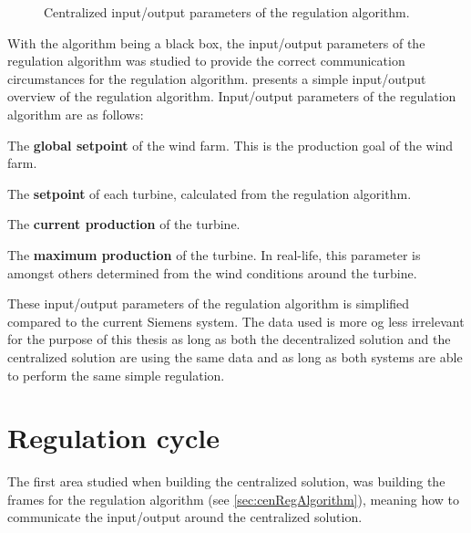 \begin{figure}
	\centering
	

	\caption[Centralized input/output parameters of the regulation algorithm]{
		\label{fig:ioCenRegAlg} 
		\footnotesize{%
			Centralized input/output parameters of the regulation algorithm.
		}
	}
\end{figure}

With the algorithm being a black box, the input/output parameters of the regulation algorithm was studied to provide the correct communication circumstances for the regulation algorithm.  presents a simple input/output overview of the regulation algorithm. Input/output parameters of the regulation algorithm are as follows:

\begin{description}
	\item The \textbf{global setpoint} of the wind farm. This is the production goal of the wind farm. %
	\item The \textbf{setpoint} of each turbine, calculated from the regulation algorithm. 
	\item The \textbf{current production} of the turbine.
	\item The \textbf{maximum production} of the turbine. In real-life, this parameter is amongst others determined from the wind conditions around the turbine.
\end{description}

These input/output parameters of the regulation algorithm is simplified compared to the current Siemens system. The data used is more og less irrelevant for the purpose of this thesis as long as both the decentralized solution and the centralized solution are using the same data and as long as both systems are able to perform the same simple regulation.

\section{Regulation cycle}\label{sec:currentSystemCen} 

The first area studied when building the centralized solution, was building the frames for the regulation algorithm (see \cref{sec:cenRegAlgorithm}), meaning how to communicate the input/output around the centralized solution.

